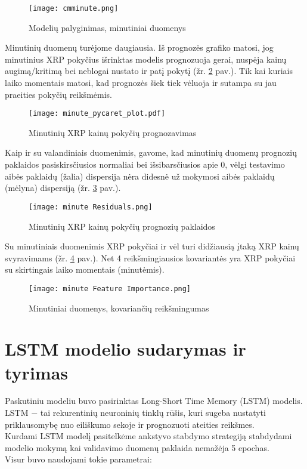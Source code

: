\documentclass[12pt,a4paper]{article}
\begin{document}
\begin{figure}[!h]
\centering
\caption{Modelių palyginimas, minutiniai duomenys}
\label{cmminute}
\texttt{[image: cmminute.png]}
\end{figure}

Minutinių duomenų turėjome daugiausia. Iš prognozės grafiko matosi, jog minutinius XRP pokyčius išrinktas modelis prognozuoja gerai, nuspėja kainų augimą/kritimą bei neblogai nustato ir patį pokytį (žr. \ref{minutepredpycaret} pav.). Tik kai kuriais laiko momentais matosi, kad prognozės šiek tiek vėluoja ir sutampa su jau praeities pokyčių reikšmėmis.

\begin{figure}[!h]
\centering
\caption{Minutinių XRP kainų pokyčių prognozavimas}
\label{minutepredpycaret}
\texttt{[image: minute\_pycaret\_plot.pdf]}
\end{figure}

Kaip ir su valandiniais duomenimis, gavome, kad minutinių duomenų prognozių paklaidos pasiskirsčiusios normaliai bei išsibarsčiusios apie 0, vėlgi testavimo aibės paklaidų (žalia)  dispersija nėra didesnė už mokymosi aibės  paklaidų (mėlyna) dispersiją (žr. \ref{minuteresidpycaret} pav.).

\begin{figure}[!h]
\centering
\caption{Minutinių XRP kainų pokyčių prognozių paklaidos}
\label{minuteresidpycaret}
\texttt{[image: minute Residuals.png]}
\end{figure}

Su minutiniais duomenimis XRP pokyčiai ir vėl turi didžiausią įtaką XRP kainų svyravimams (žr. \ref{minutefeatimportance} pav.). Net 4 reikšmingiausios kovariantės yra XRP pokyčiai su skirtingais laiko momentais (minutėmis).

\begin{figure}[!h]
\centering
\caption{Minutiniai duomenys, kovariančių reikšmingumas}
\label{minutefeatimportance}
\texttt{[image: minute Feature Importance.png]}
\end{figure}
\newpage
\clearpage


\section{LSTM modelio sudarymas ir tyrimas}
Paskutiniu modeliu buvo pasirinktas Long-Short Time Memory (LSTM) modelis. LSTM $-$ tai rekurentinių neuroninių tinklų rūšis, kuri sugeba nustatyti priklausomybę nuo eiliškumo sekoje ir prognozuoti ateities reikšmes.\\
Kurdami LSTM modelį pasitelkėme ankstyvo stabdymo strategiją stabdydami modelio mokymą kai validavimo duomenų paklaida nemažėja 5 epochas.\\
Visur buvo naudojami tokie parametrai: \\
\end{document}
